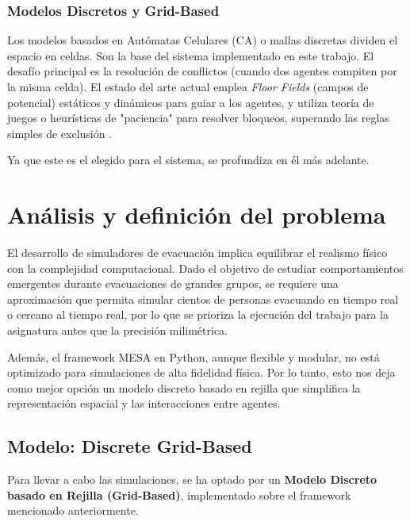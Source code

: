 \documentclass[11pt,spanish,listoffigures,listoftables]{tfgetsinf}
\begin{document}
\subsection{Modelos Discretos y Grid-Based}
Los modelos basados en Autómatas Celulares (CA) o mallas discretas dividen el espacio en celdas. Son la base del sistema implementado en este trabajo.
El desafío principal es la resolución de conflictos (cuando dos agentes compiten por la misma celda). El estado del arte actual emplea \textit{Floor Fields} (campos de potencial) estáticos y dinámicos para guiar a los agentes, y utiliza teoría de juegos o heurísticas de "paciencia" para resolver bloqueos, superando las reglas simples de exclusión \cite{davidich-2012}.

Ya que este es el elegido para el sistema, se profundiza en él más adelante.

\chapter{Análisis y definición del problema}

El desarrollo de simuladores de evacuación implica equilibrar el realismo físico con la complejidad computacional. Dado el objetivo de estudiar comportamientos emergentes durante evacuaciones de grandes grupos, se requiere una aproximación que permita simular cientos de personas evacuando en tiempo real o cercano al tiempo real, por lo que se prioriza la ejecución del trabajo para la asignatura antes que la precisión milimétrica.

Además, el framework MESA en Python, aunque flexible y modular, no está optimizado para simulaciones de alta fidelidad física. Por lo tanto, esto nos deja como mejor opción un modelo discreto basado en rejilla que simplifica la representación espacial y las interacciones entre agentes.

\section{Modelo: Discrete Grid-Based}

Para llevar a cabo las simulaciones, se ha optado por un \textbf{Modelo Discreto basado en Rejilla (Grid-Based)}, implementado sobre el framework mencionado anteriormente.
\end{document}
